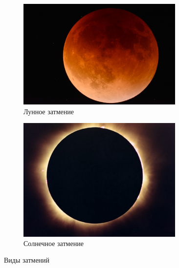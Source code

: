 \documentclass{article}
\begin{document}
    
    \begin{figure}[p]
    	\centering
    	\begin{subfigure}[b]{0.45\textwidth}
    		\includegraphics[width = 0.9\textwidth]{img/MoonEclipse}
    		\caption{Лунное затмение}
    	\end{subfigure}
    	\begin{subfigure}[b]{0.45\textwidth}
    		\includegraphics[width = 0.9\textwidth]{img/SunEclipse}
    		\caption{Солнечное затмение}
    	\end{subfigure}
    	\caption{Виды затмений}
    	\label{pic:types}
    \end{figure}
    
\end{document}
